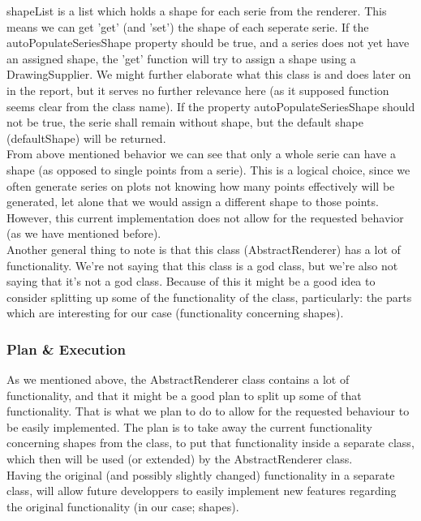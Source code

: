 \documentclass{article}
\begin{document}
shapeList is a list which holds a shape for each serie from the renderer.
This means we can get 'get' (and 'set') the shape of each seperate serie. If the autoPopulateSeriesShape property should be true, and a series does not yet have an assigned shape, the 'get' function will try to assign a shape using a DrawingSupplier. We might further elaborate what this class is and does later on in the report, but it serves no further relevance here (as it supposed function seems clear from the class name). If the property autoPopulateSeriesShape should not be true, the serie shall remain without shape, but the default shape (defaultShape) will be returned.\\ 

From above mentioned behavior we can see that only a whole serie can have a shape (as opposed to single points from a serie). This is a logical choice, since we often generate series on plots not knowing how many points effectively will be generated, let alone that we would assign a different shape to those points. However, this current implementation does not allow for the requested behavior (as we have mentioned before).\\

Another general thing to note is that this class (AbstractRenderer) has a lot of functionality. We're not saying that this class is a god class, but we're also not saying that it's not a god class. Because of this it might be a good idea to consider splitting up some of the functionality of the class, particularly: the parts which are interesting for our case (functionality concerning shapes).

\subsubsection{Plan \& Execution}

As we mentioned above, the AbstractRenderer class contains a lot of functionality, and that it might be a good plan to split up some of that functionality. That is what we plan to do to allow for the requested behaviour to be easily implemented. The plan is to take away the current functionality concerning shapes from the class, to put that functionality inside a separate class, which then will be used (or extended) by the AbstractRenderer class.\\ 

Having the original (and possibly slightly changed) functionality in a separate class, will allow future developpers to easily implement new features regarding the original functionality (in our case; shapes).
\end{document}
